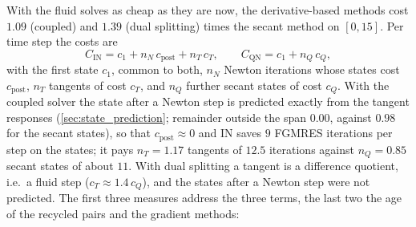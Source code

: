 \documentclass[11pt,a4paper]{article}
\theoremstyle{definition}
\theoremstyle{remark}
\begin{document}
With the fluid solves as cheap as they are now, the derivative-based methods cost $1.09$ (coupled)
and $1.39$ (dual splitting) times the secant method on $[0,15]$. Per time step the costs are
\begin{equation}\label{eq:cost_in_qn}
  C_{\mathrm{IN}}=c_1+n_N\,c_{\mathrm{post}}+n_T\,c_T,\qquad C_{\mathrm{QN}}=c_1+n_Q\,c_Q,
\end{equation}
with the first state $c_1$, common to both, $n_N$ Newton iterations whose states cost
$c_{\mathrm{post}}$, $n_T$ tangents of cost $c_T$, and $n_Q$ further secant states of cost $c_Q$.
With the coupled solver the state after a Newton step is predicted exactly from the tangent
responses (\cref{sec:state_prediction}; remainder outside the span $0.00$, against $0.98$ for the
secant states), so that $c_{\mathrm{post}}\approx0$ and IN saves $9$ FGMRES iterations per step on
the states; it pays $n_T=1.17$ tangents of $12.5$ iterations against $n_Q=0.85$ secant states of
about $11$. With dual splitting a tangent is a difference quotient, i.e.\ a fluid step
($c_T\approx1.4\,c_Q$), and the states after a Newton step were not predicted. The first three
measures address the three terms, the last two the age of the recycled pairs and the gradient
methods:
\end{document}
